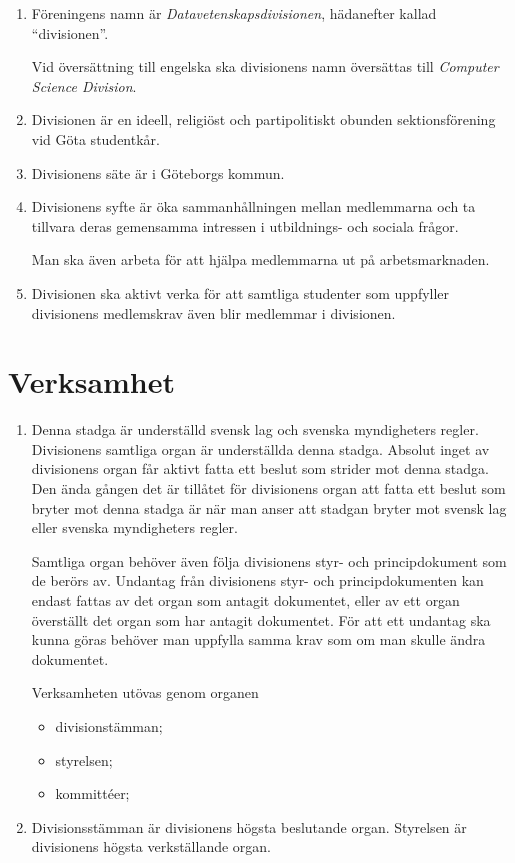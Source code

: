 \documentclass{dvd}
\begin{document}
	\begin{enumerate}[label=\arabic* §, ref=\arabic*]

		\item Föreningens namn är \emph{Datavetenskapsdivisionen}, hädanefter kallad ``divisionen''.

		Vid översättning till engelska ska divisionens namn översättas till \emph{Computer Science Division}.

		\item Divisionen är en ideell, religiöst och partipolitiskt obunden sektionsförening vid Göta studentkår.

		\item Divisionens säte är i Göteborgs kommun.

		\item Divisionens syfte är öka sammanhållningen mellan medlemmarna och ta tillvara deras gemensamma intressen i utbildnings- och sociala frågor.

		Man ska även arbeta för att hjälpa medlemmarna ut på arbetsmarknaden.

		\item Divisionen ska aktivt verka för att samtliga studenter som uppfyller divisionens medlemskrav även blir medlemmar i divisionen.
	\end{enumerate}

	\section{Verksamhet}

	\begin{enumerate}[label=\arabic* §, ref=\arabic*]
		\item Denna stadga är underställd svensk lag och svenska myndigheters regler.
		Divisionens samtliga organ är underställda denna stadga.
		Absolut inget av divisionens organ får aktivt fatta ett beslut som strider mot denna stadga.
		Den ända gången det är tillåtet för divisionens organ att fatta ett beslut som bryter mot denna stadga är när man anser att stadgan bryter mot svensk lag eller svenska myndigheters regler.

		Samtliga organ behöver även följa divisionens styr- och principdokument som de berörs av.
		Undantag från divisionens styr- och principdokumenten kan endast fattas av det organ som antagit dokumentet, eller av ett organ överställt det organ som har antagit dokumentet.
		För att ett undantag ska kunna göras behöver man uppfylla samma krav som om man skulle ändra dokumentet.


		Verksamheten utövas genom organen

		\begin{itemize}
			\item divisionstämman;
			\item styrelsen;
			\item kommittéer;
		\end{itemize}

		\item Divisionsstämman är divisionens högsta beslutande organ.
		Styrelsen är divisionens högsta verkställande organ.
	\end{enumerate}
\end{document}
